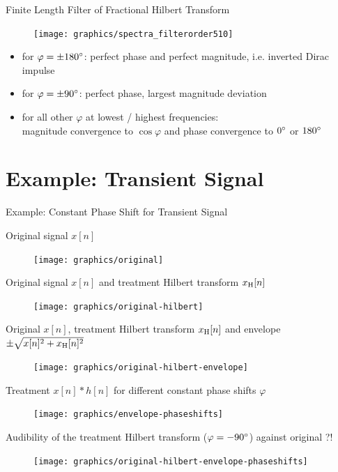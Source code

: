 \documentclass[mathserif]{intbeamer}
\begin{document}
%
%
%
\begin{frame}{Finite Length Filter of Fractional Hilbert Transform}
\begin{figure}
\texttt{[image: graphics/spectra\_filterorder510]}
\end{figure}

\begin{itemize}
\item for $\varphi=\pm 180\degree$: perfect phase and perfect magnitude, i.e. inverted Dirac impulse
\item for $\varphi=\pm 90\degree$: perfect phase, largest magnitude deviation
\item for all other $\varphi$ at lowest / highest frequencies:\\
magnitude convergence to $\cos\varphi$ and phase convergence to $0\degree$ or $180\degree$
\end{itemize}
\end{frame}
%
%
%
\section{Example: Transient Signal}
\begin{frame}{Example: Constant Phase Shift for Transient Signal}
{
Original signal $x[n]$
\begin{figure}
\texttt{[image: graphics/original]}
\end{figure}
}
{
Original signal $x[n]$ and treatment Hilbert transform $x_{\mathrm{H}}[n]$
\begin{figure}
\texttt{[image: graphics/original-hilbert]}
\end{figure}
}
{
Original $x[n]$, treatment Hilbert transform $x_{\mathrm{H}}[n]$ and envelope
$\pm\sqrt{x[n]^2+x_{\mathrm{H}}[n]^2}$
\begin{figure}
\texttt{[image: graphics/original-hilbert-envelope]}
\end{figure}
}
{
Treatment $x[n]\ast h[n]$ for different constant phase shifts $\varphi$
\begin{figure}
\texttt{[image: graphics/envelope-phaseshifts]}
\end{figure}
}
{
Audibility of the treatment Hilbert transform ($\varphi=-90\degree$) against original ?!
\begin{figure}
\texttt{[image: graphics/original-hilbert-envelope-phaseshifts]}
\end{figure}
}
\end{frame}
%
%
%
\end{document}
